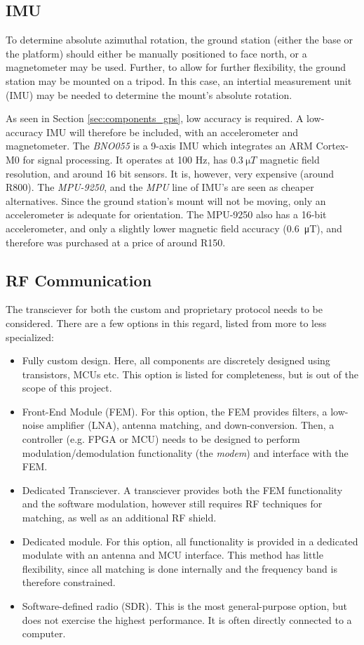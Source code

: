 \subsection{IMU}
To determine absolute azimuthal rotation, the ground station (either the base or the platform) should either be manually positioned to face north, or a magnetometer may be used. Further, to allow for further flexibility, the ground station may be mounted on a tripod. In this case, an intertial measurement unit (IMU) may be needed to determine the mount's absolute rotation.

As seen in Section \ref{sec:components_gps}, low accuracy is required. A low-accuracy IMU will therefore be included, with an accelerometer and magnetometer. The \textit{BNO055} is a 9-axis IMU which integrates an ARM Cortex-M0 for signal processing. It operates at 100 Hz, has $\SI{0.3}{\micro T}$ magnetic field resolution, and around 16 bit sensors. It is, however, very expensive (around R800). The \textit{MPU-9250}, and the \textit{MPU} line of IMU's are seen as cheaper alternatives. Since the ground station's mount will not be moving, only an accelerometer is adequate for orientation. The MPU-9250 also has a 16-bit accelerometer, and only a slightly lower magnetic field accuracy (\SI{0.6}{\micro T}), and therefore was purchased at a price of around R150.

\subsection{RF Communication}
The transciever for both the custom and proprietary protocol needs to be considered. There are a few options in this regard, listed from more to less specialized:
\begin{itemize}
    \item Fully custom design. Here, all components are discretely designed using transistors, MCUs etc. This option is listed for completeness, but is out of the scope of this project.
    \item Front-End Module (FEM). For this option, the FEM provides filters, a low-noise amplifier (LNA), antenna matching, and down-conversion. Then, a controller (e.g. FPGA or MCU) needs to be designed to perform modulation/demodulation functionality (the \textit{modem}) and interface with the FEM.
    \item Dedicated Transciever. A transciever provides both the FEM functionality and the software modulation, however still requires RF techniques for matching, as well as an additional RF shield.
    \item Dedicated module. For this option, all functionality is provided in a dedicated modulate with an antenna and MCU interface. This method has little flexibility, since all matching is done internally and the frequency band is therefore constrained.
    \item Software-defined radio (SDR). This is the most general-purpose option, but does not exercise the highest performance. It is often directly connected to a computer.
\end{itemize}

